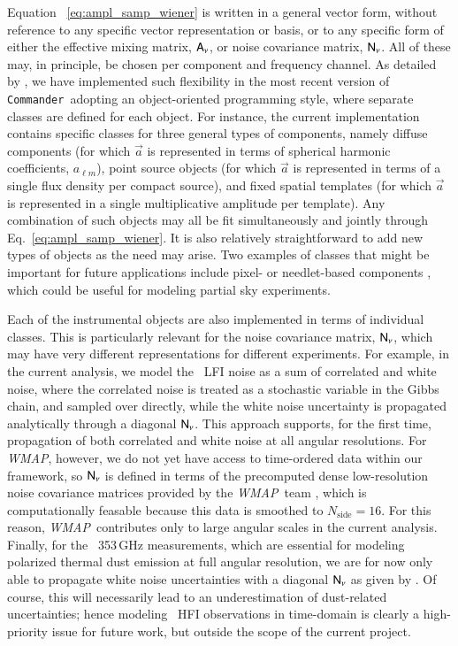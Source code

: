 \documentclass[twocolumn]{aa}
\def\WMAP{\textit{WMAP}}
\def\nside{N_{\mathrm{side}}}
\def\commander{\texttt{Commander}}
\newcommand{\A}[0]{\tens{A}}
\renewcommand{\a}[0]{\vec{a}}
\newcommand{\N}[0]{\tens{N}}
\newcommand{\?}[1]{\textcolor{red}{{\bf [#1]}}}
\begin{document}
Equation ~\eqref{eq:ampl_samp_wiener} is written in a general vector
form, without reference to any specific vector representation or
basis, or to any specific form of either the effective mixing matrix,
$\A_{\nu}$, or noise covariance matrix, $\N_{\nu}$. All of these may,
in principle, be chosen per component and frequency channel. As
detailed by \citet{bp03}, we have implemented such flexibility in the
most recent version of \commander\ adopting an object-oriented
programming style, where separate classes are defined for each
object. For instance, the current implementation contains specific
classes for three general types of components, namely diffuse
components (for which $\a$ is represented in terms of spherical
harmonic coefficients, $a_{\ell m}$), point source objects (for which
$\a$ is represented in terms of a single flux density per compact
source), and fixed spatial templates (for which $\a$ is represented in
a single multiplicative amplitude per template). Any combination of
such objects may all be fit simultaneously and jointly through
Eq.~\eqref{eq:ampl_samp_wiener}. It is also relatively straightforward
to add new types of objects as the need may arise. Two examples of
classes that might be important for future applications include pixel-
or needlet-based components \citep[e.g.,][]{marinucci:2008}, which
could be useful for modeling partial sky experiments.

Each of the instrumental objects are also implemented in terms of individual
classes. This is particularly relevant for the noise covariance matrix,
$\N_{\nu}$, which may have very different representations for different
experiments. For example, in the current analysis, we model the \Planck\ LFI
noise as a sum of correlated and white noise, where the correlated noise is
treated as a stochastic variable in the Gibbs chain, and sampled over directly,
while the white noise uncertainty is propagated analytically through a diagonal
$\N_{\nu}$. This approach supports, for the first time, propagation of both
correlated and white noise at all angular resolutions. For \WMAP, however, we do
not yet have access to time-ordered data within our framework, so $\N_{\nu}$ is
defined in terms of the precomputed dense low-resolution noise covariance
matrices provided by the \WMAP\ team \citep{bennett2012}, which is
computationally feasable because this data is smoothed to $\nside=16$. For this
reason, \WMAP\ contributes only to large angular scales in the current analysis.
Finally, for the \Planck\ 353\,GHz measurements, which are essential for
modeling polarized thermal dust emission at full angular resolution, we are for
now only able to propagate white noise uncertainties with a diagonal $\N_{\nu}$
as given by \citet{planck2020-LVII}. Of course, this will necessarily lead to an
underestimation of dust-related uncertainties; hence modeling \Planck\ HFI
observations in time-domain is clearly a high-priority issue for future work,
but outside the scope of the current project.
\end{document}
